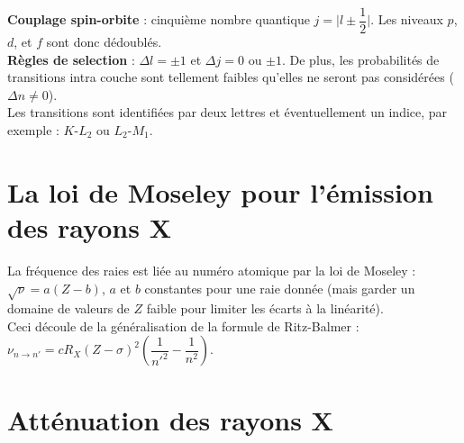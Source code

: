 \documentclass[13pt, twoside, a4paper, french, tikz]{report}
\begin{document}
      \textbf{Couplage spin-orbite} : cinquième nombre quantique $j = \bigg | l \pm \dfrac{1}{2} \bigg |$.
      Les niveaux $p$, $d$, et $f$ sont donc dédoublés.\\
      
      \textbf{Règles de selection} : $\Delta l = \pm 1$ et $\Delta j = 0$ ou $\pm 1$.
      De plus, les probabilités de transitions intra couche sont tellement faibles qu'elles ne seront pas considérées ($\Delta n \neq 0$).\\
      
      Les transitions sont identifiées par deux lettres et éventuellement un indice, par exemple : $K$-$L_2$ ou $L_2$-$M_1$.
  
  
  \section{La loi de Moseley pour l'émission des rayons X}\label{sec:la-loi-de-moseley-pour-l'emission-des-rayons-x}
    
    La fréquence des raies est liée au numéro atomique par la loi de Moseley : $\sqrt{\nu} = a(Z-b)$, $a$ et $b$ constantes pour une raie donnée (mais garder un domaine de valeurs de $Z$ faible pour limiter les écarts à la linéarité).\\
    Ceci découle de la généralisation de la formule de Ritz-Balmer : $\nu_{n\rightarrow n'} = c R_X (Z - \sigma)^2\left(\dfrac{1}{n'^2} - \dfrac{1}{n^2}\right)$.
  
  
  \section{Atténuation des rayons X}\label{sec:attenuation-des-rayons-x}
    
\end{document}
